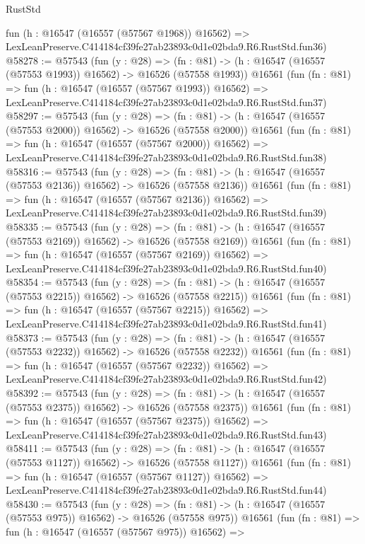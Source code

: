 \begin{lexlean}{RustStd}
\begin{coremodule}
    fun (h : @16547 (@16557 (@57567 @1968)) @16562) =>
    LexLeanPreserve.C414184cf39fe27ab23893c0d1e02bda9.R6.RustStd.fun36)
@58278 := @57543
    (fun (y : @28) =>
    (fn : @81) -> (h : @16547 (@16557 (@57553 @1993)) @16562) -> @16526 (@57558 @1993))
    @16561
    (fun (fn : @81) =>
    fun (h : @16547 (@16557 (@57567 @1993)) @16562) =>
    LexLeanPreserve.C414184cf39fe27ab23893c0d1e02bda9.R6.RustStd.fun37)
@58297 := @57543
    (fun (y : @28) =>
    (fn : @81) -> (h : @16547 (@16557 (@57553 @2000)) @16562) -> @16526 (@57558 @2000))
    @16561
    (fun (fn : @81) =>
    fun (h : @16547 (@16557 (@57567 @2000)) @16562) =>
    LexLeanPreserve.C414184cf39fe27ab23893c0d1e02bda9.R6.RustStd.fun38)
@58316 := @57543
    (fun (y : @28) =>
    (fn : @81) -> (h : @16547 (@16557 (@57553 @2136)) @16562) -> @16526 (@57558 @2136))
    @16561
    (fun (fn : @81) =>
    fun (h : @16547 (@16557 (@57567 @2136)) @16562) =>
    LexLeanPreserve.C414184cf39fe27ab23893c0d1e02bda9.R6.RustStd.fun39)
@58335 := @57543
    (fun (y : @28) =>
    (fn : @81) -> (h : @16547 (@16557 (@57553 @2169)) @16562) -> @16526 (@57558 @2169))
    @16561
    (fun (fn : @81) =>
    fun (h : @16547 (@16557 (@57567 @2169)) @16562) =>
    LexLeanPreserve.C414184cf39fe27ab23893c0d1e02bda9.R6.RustStd.fun40)
@58354 := @57543
    (fun (y : @28) =>
    (fn : @81) -> (h : @16547 (@16557 (@57553 @2215)) @16562) -> @16526 (@57558 @2215))
    @16561
    (fun (fn : @81) =>
    fun (h : @16547 (@16557 (@57567 @2215)) @16562) =>
    LexLeanPreserve.C414184cf39fe27ab23893c0d1e02bda9.R6.RustStd.fun41)
@58373 := @57543
    (fun (y : @28) =>
    (fn : @81) -> (h : @16547 (@16557 (@57553 @2232)) @16562) -> @16526 (@57558 @2232))
    @16561
    (fun (fn : @81) =>
    fun (h : @16547 (@16557 (@57567 @2232)) @16562) =>
    LexLeanPreserve.C414184cf39fe27ab23893c0d1e02bda9.R6.RustStd.fun42)
@58392 := @57543
    (fun (y : @28) =>
    (fn : @81) -> (h : @16547 (@16557 (@57553 @2375)) @16562) -> @16526 (@57558 @2375))
    @16561
    (fun (fn : @81) =>
    fun (h : @16547 (@16557 (@57567 @2375)) @16562) =>
    LexLeanPreserve.C414184cf39fe27ab23893c0d1e02bda9.R6.RustStd.fun43)
@58411 := @57543
    (fun (y : @28) =>
    (fn : @81) -> (h : @16547 (@16557 (@57553 @1127)) @16562) -> @16526 (@57558 @1127))
    @16561
    (fun (fn : @81) =>
    fun (h : @16547 (@16557 (@57567 @1127)) @16562) =>
    LexLeanPreserve.C414184cf39fe27ab23893c0d1e02bda9.R6.RustStd.fun44)
@58430 := @57543
    (fun (y : @28) =>
    (fn : @81) -> (h : @16547 (@16557 (@57553 @975)) @16562) -> @16526 (@57558 @975))
    @16561
    (fun (fn : @81) =>
    fun (h : @16547 (@16557 (@57567 @975)) @16562) =>

\end{coremodule}
\end{lexlean}
